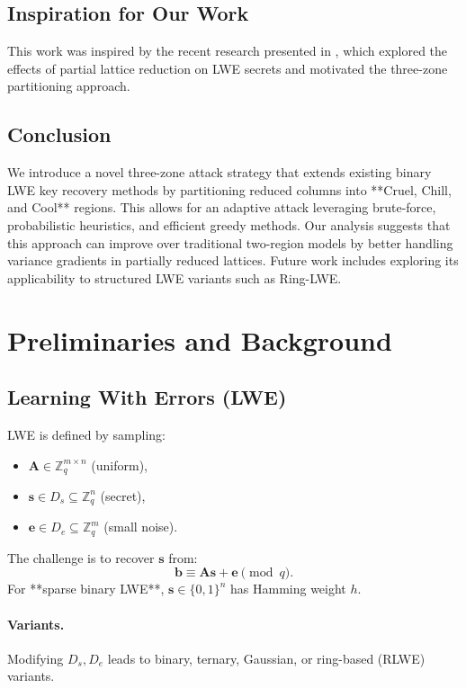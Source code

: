 \documentclass[conference]{IEEEtran}
\begin{document}
  \subsection{Inspiration for Our Work}
  This work was inspired by the recent research presented in \cite{cool-and-cruel}, which explored the effects of partial lattice reduction on LWE secrets and motivated the three-zone partitioning approach.
  
  \subsection{Conclusion}
  
  We introduce a novel three-zone attack strategy that extends existing binary LWE key recovery methods by partitioning reduced columns into **Cruel, Chill, and Cool** regions. This allows for an adaptive attack leveraging brute-force, probabilistic heuristics, and efficient greedy methods. Our analysis suggests that this approach can improve over traditional two-region models by better handling variance gradients in partially reduced lattices. Future work includes exploring its applicability to structured LWE variants such as Ring-LWE.
  
  \section{Preliminaries and Background}
  \label{sec:preliminaries}
  
  \subsection{Learning With Errors (LWE)}
  \label{subsec:lwe-def}
  
  LWE is defined by sampling:
  \begin{itemize}
      \item $\mathbf{A} \in \mathbb{Z}_q^{m \times n}$ (uniform),
      \item $\mathbf{s} \in D_s \subseteq \mathbb{Z}_q^n$ (secret),
      \item $\mathbf{e} \in D_e \subseteq \mathbb{Z}_q^m$ (small noise).
  \end{itemize}
  The challenge is to recover $\mathbf{s}$ from:
  \[
      \mathbf{b} \equiv \mathbf{A}\mathbf{s} + \mathbf{e} \pmod{q}.
  \]
  For **sparse binary LWE**, $\mathbf{s} \in \{0,1\}^n$ has Hamming weight $h$.
  
  \paragraph{Variants.} 
  Modifying $D_s, D_e$ leads to binary, ternary, Gaussian, or ring-based (RLWE) variants.
  
\end{document}
